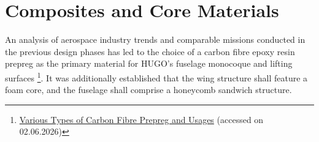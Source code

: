 

\section{Composites and Core Materials}
\label{sec:composites}

An analysis of aerospace industry trends and comparable missions conducted in the previous design phases  has led to the choice of a carbon fibre epoxy resin prepreg as the primary material for HUGO's fuselage monocoque and lifting surfaces \footnote{\label{fn:prepregs}\href{https://www.hgcomposites.com/info/various-types-of-carbon-fiber-prepreg-83847115.html}{Various Types of Carbon Fibre Prepreg and Usages} (accessed on 02.06.2026)}. It was additionally established that the wing structure shall feature a foam core, and the fuselage shall comprise a honeycomb sandwich structure. 

